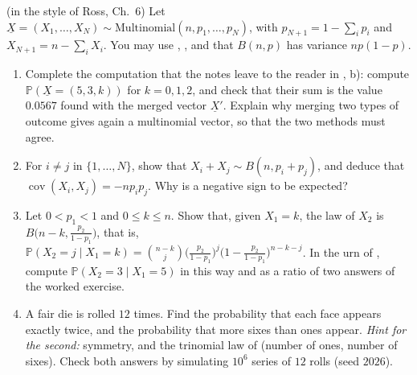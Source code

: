 
\begin{exercise}\label{ex:tr-multinomial}
\medium (in the style of Ross, Ch.~6) Let
$\underline X=(X_1,\dots,X_N)\sim\mathrm{Multinomial}(n,p_1,\dots,p_N)$, with $p_{N+1}=1-\sum_ip_i$
and $X_{N+1}=n-\sum_iX_i$. You may use ,
, and that $B(n,p)$ has variance $np(1-p)$.
\begin{enumerate}[label=(\alph*)]
  \item Complete the computation that the notes leave to the reader in , b):
    compute $\mathbb P(\underline X=(5,3,k))$ for $k=0,1,2$, and check that their sum is the value
    $0.0567$ found with the merged vector $\underline X'$. Explain why merging two types of outcome
    gives again a multinomial vector, so that the two methods must agree.
  \item For $i\ne j$ in $\{1,\dots,N\}$, show that $X_i+X_j\sim B(n,p_i+p_j)$, and deduce that
    $\operatorname{cov}(X_i,X_j)=-np_ip_j$. Why is a negative sign to be expected?
  \item Let $0<p_1<1$ and $0\le k\le n$. Show that, given $X_1=k$, the law of $X_2$ is
    $B\big(n-k,\frac{p_2}{1-p_1}\big)$, that is,
    $\mathbb P(X_2=j\mid X_1=k)=\binom{n-k}j\big(\frac{p_2}{1-p_1}\big)^j\big(1-\frac{p_2}{1-p_1}\big)^{n-k-j}$.
    In the urn of , compute $\mathbb P(X_2=3\mid X_1=5)$ in this way and as a
    ratio of two answers of the worked exercise.
  \item A fair die is rolled $12$ times. Find the probability that each face appears exactly
    twice, and the probability that more sixes than ones appear. \emph{Hint for the second:}
    symmetry, and the trinomial law of (number of ones, number of sixes). Check both answers by
    simulating $10^6$ series of $12$ rolls (seed $2026$).
\end{enumerate}
\end{exercise}

